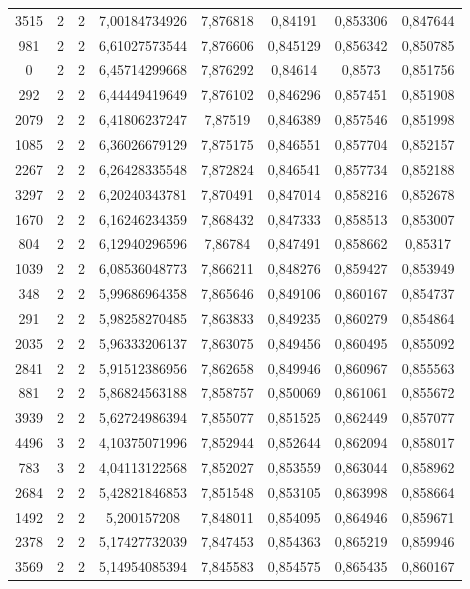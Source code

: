 \begin{longtable}{|c|c|c|c|c|c|c|c|}
3515 & 2 & 2 & 7,00184734926 & 7,876818 & 0,84191 & 0,853306 & 0,847644 \\
981 & 2 & 2 & 6,61027573544 & 7,876606 & 0,845129 & 0,856342 & 0,850785 \\
0 & 2 & 2 & 6,45714299668 & 7,876292 & 0,84614 & 0,8573 & 0,851756 \\
292 & 2 & 2 & 6,44449419649 & 7,876102 & 0,846296 & 0,857451 & 0,851908 \\
2079 & 2 & 2 & 6,41806237247 & 7,87519 & 0,846389 & 0,857546 & 0,851998 \\
1085 & 2 & 2 & 6,36026679129 & 7,875175 & 0,846551 & 0,857704 & 0,852157 \\
2267 & 2 & 2 & 6,26428335548 & 7,872824 & 0,846541 & 0,857734 & 0,852188 \\
3297 & 2 & 2 & 6,20240343781 & 7,870491 & 0,847014 & 0,858216 & 0,852678 \\
1670 & 2 & 2 & 6,16246234359 & 7,868432 & 0,847333 & 0,858513 & 0,853007 \\
804 & 2 & 2 & 6,12940296596 & 7,86784 & 0,847491 & 0,858662 & 0,85317 \\
1039 & 2 & 2 & 6,08536048773 & 7,866211 & 0,848276 & 0,859427 & 0,853949 \\
348 & 2 & 2 & 5,99686964358 & 7,865646 & 0,849106 & 0,860167 & 0,854737 \\
291 & 2 & 2 & 5,98258270485 & 7,863833 & 0,849235 & 0,860279 & 0,854864 \\
2035 & 2 & 2 & 5,96333206137 & 7,863075 & 0,849456 & 0,860495 & 0,855092 \\
2841 & 2 & 2 & 5,91512386956 & 7,862658 & 0,849946 & 0,860967 & 0,855563 \\
881 & 2 & 2 & 5,86824563188 & 7,858757 & 0,850069 & 0,861061 & 0,855672 \\
3939 & 2 & 2 & 5,62724986394 & 7,855077 & 0,851525 & 0,862449 & 0,857077 \\
4496 & 3 & 2 & 4,10375071996 & 7,852944 & 0,852644 & 0,862094 & 0,858017 \\
783 & 3 & 2 & 4,04113122568 & 7,852027 & 0,853559 & 0,863044 & 0,858962 \\
2684 & 2 & 2 & 5,42821846853 & 7,851548 & 0,853105 & 0,863998 & 0,858664 \\
1492 & 2 & 2 & 5,200157208 & 7,848011 & 0,854095 & 0,864946 & 0,859671 \\
2378 & 2 & 2 & 5,17427732039 & 7,847453 & 0,854363 & 0,865219 & 0,859946 \\
3569 & 2 & 2 & 5,14954085394 & 7,845583 & 0,854575 & 0,865435 & 0,860167 \\

\end{longtable}
